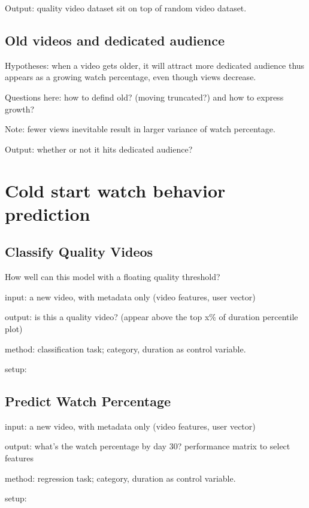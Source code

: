 Output: quality video dataset sit on top of random video dataset.


\subsection{Old videos and dedicated audience}

Hypotheses: when a video gets older, it will attract more dedicated audience thus appears as a growing watch percentage, even though views decrease.

Questions here: how to defind old? (moving truncated?) and how to express growth?

Note: fewer views inevitable result in larger variance of watch percentage.

Output: whether or not it hits dedicated audience?



\section{Cold start watch behavior prediction}

\subsection{Classify Quality Videos}
How well can this model with a floating quality threshold?

input: a new video, with metadata only (video features, user vector)

output: is this a quality video? (appear above the top x\% of duration percentile plot)

method: classification task; category, duration as control variable.

setup: 

\subsection{Predict Watch Percentage}
input: a new video, with metadata only (video features, user vector)

output: what's the watch percentage by day 30? performance matrix to select features

method: regression task; category, duration as control variable.

setup: 


